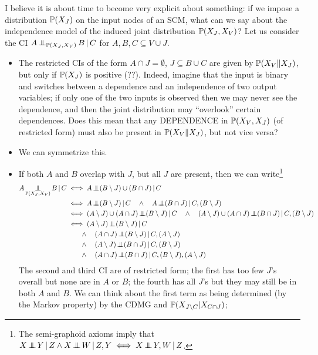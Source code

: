 I believe it is about time to become very explicit about something: if we impose a distribution $\mathbb{P}(X_J)$ on the input nodes
of an SCM, what can we say about the independence model of the induced joint distribution $\mathbb{P}(X_J,X_V)$? Let us consider the
CI $A \operatorname*{\perp\mkern-11mu\perp}_{\mathbb{P}(X_J,X_V)} B \operatorname*{|} C$ for $A,B,C \subseteq V\cup J$.
\begin{itemize}
  \item The restricted CIs of the form $A \cap J = \emptyset$, $J \subseteq B \cup C$ are given by $\mathbb{P}(X_V \Vert X_J)$,
    but only if $\mathbb{P}(X_J)$ is positive (??). Indeed, imagine that the input is binary and switches between a dependence and
    an independence of two output variables; if only one of the two inputs is observed then we may never see the dependence,
    and then the joint distribution may ``overlook'' certain dependences. Does this mean that any DEPENDENCE in $\mathbb{P}(X_V,X_J)$ (of restricted form) must also be present in $\mathbb{P}(X_V \Vert X_J)$, but not vice versa?
  \item We can symmetrize this.
  \item If both $A$ and $B$ overlap with $J$, but all $J$ are present, then we can write\footnote{The semi-graphoid axioms imply that $X \operatorname*{\perp\mkern-11mu\perp} Y \operatorname*{|} Z \land X \operatorname*{\perp\mkern-11mu\perp} W \operatorname*{|} Z,Y \iff X \operatorname*{\perp\mkern-11mu\perp} Y,W \operatorname*{|} Z$.}
    \begin{equation*}\begin{split}
      A \Indep_{\Prb(X_J,X_V)} B \given C 
    & \iff A \Indep (B\sm J) \cup (B \cap J) \given C \\
    & \iff A \Indep (B\sm J) \given C \quad\land\quad A \Indep (B \cap J) \given C,(B\sm J) \\
      & \iff (A\sm J) \cup (A\cap J) \Indep (B\sm J) \given C \quad\land\quad (A\sm J) \cup (A\cap J) \Indep (B \cap J) \given C,(B\sm J) \\
      & \iff (A\sm J) \Indep (B\sm J) \given C \\
      & \qquad\land\quad (A\cap J) \Indep (B\sm J) \given C,(A\sm J) \\
      & \qquad\land\quad (A\sm J) \Indep (B \cap J) \given C,(B\sm J) \\
      & \qquad\land\quad (A\cap J) \Indep (B \cap J) \given C,(B\sm J),(A\sm J)
    \end{split}\end{equation*}
    The second and third CI are of restricted form; the first has too few $J$'s overall but none are in $A$ or $B$; the fourth has all $J$'s but they may still be in both $A$ and $B$.
    We can think about the first term as being determined (by the Markov property) by the CDMG and $\mathbb{P}(X_{J\setminus C}|X_{C\cap J})$;

\end{itemize}
